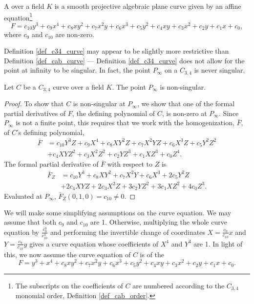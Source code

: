 \begin{definition}
  \label{def_c34_curve}
  A  over a field $K$
  is a smooth projective algebraic plane curve
  given by an affine equation\footnote{
  The subscripts on the coefficients of $C$ are numbered according to the $C_{3,4}$ monomial order,
  Definition \ref{def_cab_order}.}
  \[ F = c_{10}y^3 + c_9x^4 + c_8xy^2 + c_7x^2y + c_6x^3 + c_5y^2 + c_4xy + c_3x^2 + c_2y + c_1x + c_0, \]
  where $c_{9}$ and $c_{10}$ are non-zero.
\end{definition}

Definition \ref{def_c34_curve} may appear to be slightly more restrictive than Definition \ref{def_cab_curve} ---
Definition \ref{def_c34_curve} does not allow for the point at infinity to be singular.
In fact, the point $P_\infty$ on a $C_{3,4}$ is never singular.

\begin{proposition}
  Let $C$ be a $C_{3,4}$ curve over a field $K$.
  The point $P_\infty$ is non-singular.
\end{proposition}
\begin{proof}
  To show that $C$ is non-singular at $P_\infty$,
  we show that one of the formal partial derivatives of $F$,
  the defining polynomial of $C$, is non-zero at $P_\infty$.
  Since $P_\infty$ is not a finite point,
  this requires that we work with the homogenization, $\bar F$, of $C$'s defining polynomial,
  \begin{align*}
    \bar F &= c_{10}Y^3Z + c_9X^4 + c_8XY^2Z + c_7X^2YZ + c_6X^3Z + c_5Y^2Z^2 \\ 
           &+ c_4XYZ^2 + c_3X^2Z^2 + c_2YZ^3 + c_1XZ^3 + c_0Z^4.
  \end{align*}
  The formal partial derivative of $\bar F$ with respect to $Z$ is
  \begin{align*}
    \bar F_Z &= c_{10}Y^3 + c_8XY^2 + c_7X^2Y + c_6X^3 + 2c_5Y^2Z \\
             &+ 2c_4XYZ + 2c_3X^2Z + 3c_2YZ^2 + 3c_1XZ^2 + 4c_0Z^3.
  \end{align*}
  Evaluated at $P_\infty$, $\bar F_Z(0, 1, 0) = c_{10} \neq 0$.
\end{proof}

We will make some simplifying assumptions on the curve equation.
We may assume that both $c_9$ and $c_{10}$ are 1.
Otherwise, multiplying the whole curve equation by $\frac {c_9^3} {c_{10}^4}$
and performing the invertible change of coordinates
$X = \frac {c_9} {c_{10}} x$ and $Y = \frac {c_9} {c_{10}} y$
gives a curve equation whose coefficients of $X^4$ and $Y^3$ are 1.
In light of this, we now assume the curve equation of $C$ is of the 
\begin{equation}
  \label{eq_c34}
  F = y^3 + x^4 + c_8xy^2 + c_7x^2y + c_6x^3 + c_5y^2 + c_4xy + c_3x^2 + c_2y + c_1x + c_0.
\end{equation}

